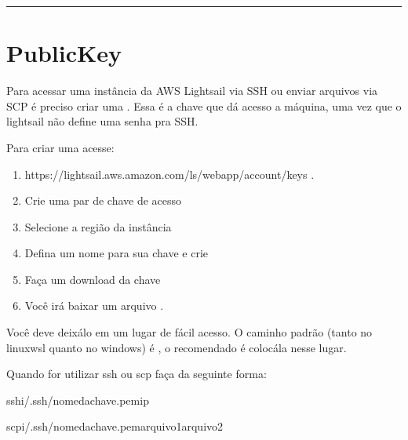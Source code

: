 \documentclass[letterpaper,10pt,brazil]{sphinxmanual}
\begin{document}
\bigskip\hrule\bigskip



\section{PublicKey}
\label{\detokenize{sistemas/aws:publickey}}
\sphinxAtStartPar
Para acessar uma instância da AWS Lightsail via SSH ou enviar arquivos via SCP é preciso criar uma . Essa é a chave que dá acesso a máquina, uma vez que o lightsail não define uma senha pra SSH.

\sphinxAtStartPar
Para criar uma  acesse:
\begin{enumerate}
%
\item {} 
\sphinxAtStartPar
https://lightsail.aws.amazon.com/ls/webapp/account/keys .

\item {} 
\sphinxAtStartPar
Crie uma par de chave de acesso

\item {} 
\sphinxAtStartPar
Selecione a região da instância

\item {} 
\sphinxAtStartPar
Defina um nome para sua chave e crie

\item {} 
\sphinxAtStartPar
Faça um download da chave

\item {} 
\sphinxAtStartPar
Você irá baixar um arquivo .

\end{enumerate}

\sphinxAtStartPar
Você deve deixá\sphinxhyphen{}lo em um lugar de fácil acesso. O caminho padrão (tanto no linux\sphinxhyphen{}wsl quanto no windows) é , o recomendado é colocá\sphinxhyphen{}la nesse lugar.

\sphinxAtStartPar
Quando for utilizar ssh ou scp faça da seguinte forma:

\begin{sphinxVerbatim}[commandchars=\\\{\}]
ssh\PYGZhy{}i\PYGZti{}/.ssh/\PYGZlt{}nome\PYGZus{}da\PYGZus{}chave\PYGZgt{}.pem\PYGZlt{}ip\PYGZgt{}

scp\PYGZhy{}i\PYGZti{}/.ssh/\PYGZlt{}nome\PYGZus{}da\PYGZus{}chave\PYGZgt{}.pem\PYGZlt{}arquivo1\PYGZgt{}\PYGZlt{}arquivo2\PYGZgt{}
\end{sphinxVerbatim}
\end{document}
